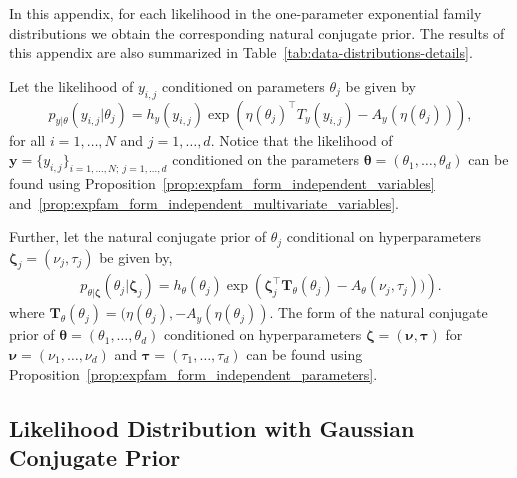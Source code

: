 In this appendix, for each likelihood in the one-parameter exponential family distributions we obtain the corresponding natural conjugate prior. The results of this appendix are also summarized in Table~\ref{tab:data-distributions-details}.

Let the likelihood of ${y}_{i,j}$ conditioned on parameters $\theta_j$ be given by
\begin{equation*}
p_{{y}\vert{\theta}}({y}_{i,j} \vert {\theta}_j) = h_{{y}}({y}_{i,j})   \exp \left( {\eta}({\theta}_j)^{\top} {T}_{{y}}({y}_{i,j}) - {A}_{{y}}({\eta}({\theta}_j)) \right),
\end{equation*}
for all $i = 1, \ldots, N$ and $j = 1, \dots, d$. Notice that the likelihood of $\mathbf{y} = \{y_{i,j}\}_{i = 1, \ldots, N;\: j = 1, \ldots, d}$ conditioned on the parameters $\boldsymbol{\theta} = (\theta_1, \ldots, \theta_d)$ can be found using Proposition~\ref{prop:expfam_form_independent_variables} and~\ref{prop:expfam_form_independent_multivariate_variables}. 

Further, let the natural conjugate prior of $\theta_j$ conditional on hyperparameters $\boldsymbol{\zeta}_j = (\nu_j, \tau_j)$ be given by, 
\begin{align*} 
    p_{{\theta}|\boldsymbol{\zeta}}({\theta}_j|\boldsymbol{\zeta}_j) = h_{{\theta}}(\theta_j) \exp \left(\boldsymbol{\zeta}_j^\top \mathbf{T}_{\theta}(\theta_j) - A_{{\theta}}({\nu}_j,  {\tau}_j)) \right).
\end{align*}
where $ \mathbf{T}_{\theta}(\theta_j)= ({\eta}({\theta}_j), -{A}_{{y}}({\eta}({\theta}_j))$. The form of the natural conjugate prior of  $\boldsymbol{\theta} = (\theta_1, \ldots, \theta_d)$ conditioned on hyperparameters $\boldsymbol{\zeta} = (\boldsymbol{\nu}, \boldsymbol{\tau})$  for $\boldsymbol{\nu} = (\nu_1, \ldots,\nu_d)$ and $\boldsymbol{\tau} = (\tau_1, \ldots,\tau_d)$ can be found using Proposition~\ref{prop:expfam_form_independent_parameters}.

%
%

\subsection{Likelihood Distribution with Gaussian Conjugate Prior}

